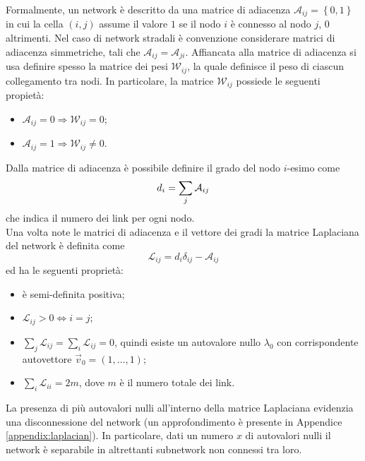 \documentclass[../main.tex]{subfiles}
\begin{document}
Formalmente, un network \`e descritto da una matrice di adiacenza $\mathcal{A}_{ij}=\left\{0,1\right\}$ in cui la cella $(i,j)$ assume il valore $1$ se il nodo $i$ \`e connesso al nodo $j$, $0$ altrimenti.
Nel caso di network stradali \`e convenzione considerare matrici di adiacenza simmetriche, tali che $\mathcal{A}_{ij}=\mathcal{A}_{ji}$.
Affiancata alla matrice di adiacenza si usa definire spesso la matrice dei pesi $\mathcal{W}_{ij}$, la quale definisce il peso di ciascun collegamento tra nodi.
In particolare, la matrice $\mathcal{W}_{ij}$ possiede le seguenti propiet\`a:
\begin{itemize}
    \item $\mathcal{A}_{ij} = 0 \Longrightarrow \mathcal{W}_{ij} = 0$;
    \item $\mathcal{A}_{ij} = 1 \Longrightarrow \mathcal{W}_{ij} \neq 0$.
\end{itemize}
Dalla matrice di adiacenza \`e possibile definire il grado del nodo $i$-esimo come
\begin{equation*}
    d_i=\sum_j\mathcal{A}_{ij}\\
\end{equation*}
che indica il numero dei link per ogni nodo.
\\Una volta note le matrici di adiacenza e il vettore dei gradi la matrice Laplaciana del network \`e definita come
\begin{equation}
    \mathcal{L}_{ij}=d_i\delta_{ij}-\mathcal{A}_{ij}
\end{equation}
ed ha le seguenti propriet\`a:
\begin{itemize}
    \item \`e semi-definita positiva;
    \item $\mathcal{L}_{ij}>0\Longleftrightarrow i=j$;
    \item $\sum_j\mathcal{L}_{ij}=\sum_i\mathcal{L}_{ij}=0$, quindi esiste un autovalore nullo $\lambda_0$ con corrispondente autovettore $\vec{v}_0=(1,\ldots,1)$;
    \item $\sum_i\mathcal{L}_{ii}=2m$, dove $m$ \`e il numero totale dei link.
\end{itemize}
La presenza di pi\`u autovalori nulli all'interno della matrice Laplaciana evidenzia una disconnessione del network (un approfondimento \`e presente in Appendice \ref{appendix:laplacian}).
In particolare, dati un numero $x$ di autovalori nulli il network \`e separabile in altrettanti subnetwork non connessi tra loro.
\end{document}
